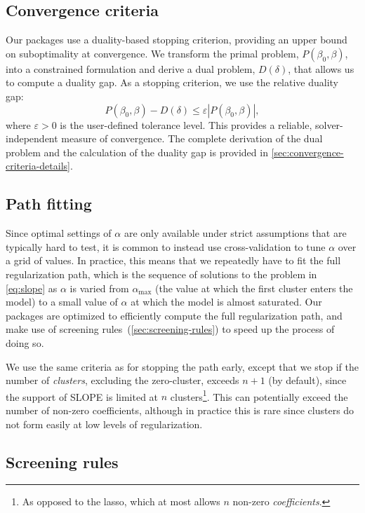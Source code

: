 \documentclass[article]{jss}
\begin{document}
\subsection{Convergence criteria}

Our packages use a duality-based stopping criterion, providing an upper bound
on suboptimality at convergence. We transform the primal problem, \(P(\beta_0,
\beta)\), into a constrained formulation and derive a dual problem,
\(D(\delta)\), that allows us to compute a duality gap. As a stopping
criterion, we use the relative duality gap: \[ P(\beta_0, \beta) - D(\delta)
  \leq \varepsilon | P(\beta_0, \beta) |, \] where \(\varepsilon >0\) is the
user-defined tolerance level. This provides a reliable, solver-independent
measure of convergence. The complete derivation of the dual problem and the
calculation of the duality gap is provided in
\autoref{sec:convergence-criteria-details}.

\subsection{Path fitting}

Since optimal settings of \(\alpha\) are only available under strict
assumptions that are typically hard to test, it is common to instead use
cross-validation to tune \(\alpha\) over a grid of values. In practice, this
means that we repeatedly have to fit the full regularization path, which is the
sequence of solutions to the problem in \autoref{eq:slope} as \(\alpha\) is
varied from \(\alpha_\text{max}\) (the value at which the first cluster enters
the model) to a small value of \(\alpha\) at which the model is almost
saturated. Our packages are optimized to efficiently compute the full
regularization path, and make use of  screening
rules~(\autoref{sec:screening-rules}) to speed up the process of doing so.

We use the same criteria as \citet{friedman2010} for stopping the path early,
except that we stop if the number of \emph{clusters}, excluding the zero-cluster,
exceeds \(n + 1\) (by default), since the support of SLOPE is limited at \(n\)
clusters\footnote{As opposed to the lasso, which at most allows \(n\) non-zero
  \emph{coefficients}.}. This can potentially exceed the number of non-zero
coefficients, although in practice this is rare since clusters do not form
easily at low levels of regularization.

\subsection{Screening rules}\label{sec:screening-rules}
\end{document}
